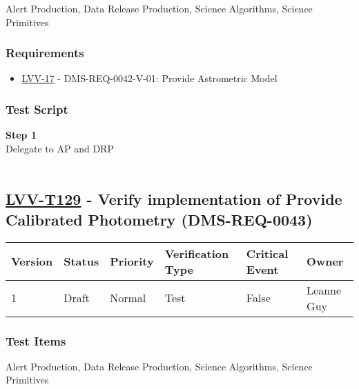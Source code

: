 Alert Production, Data Release Production, Science Algorithms, Science
Primitives~

\hypertarget{requirements-105}{%
\subsubsection{Requirements}\label{requirements-105}}

\begin{itemize}
\tightlist
\item
  \href{https://jira.lsstcorp.org/browse/LVV-17}{LVV-17} -
  DMS-REQ-0042-V-01: Provide Astrometric Model
\end{itemize}

\hypertarget{test-script-105}{%
\subsubsection{Test Script}\label{test-script-105}}

\textbf{Step 1}\\
Delegate to AP and DRP\\
~\\

\hypertarget{lvv-t129---verify-implementation-of-provide-calibrated-photometry-dms-req-0043}{%
\subsection{\texorpdfstring{\href{https://jira.lsstcorp.org/secure/Tests.jspa\#/testCase/LVV-T129}{LVV-T129}
- Verify implementation of Provide Calibrated Photometry
(DMS-REQ-0043)}{LVV-T129 - Verify implementation of Provide Calibrated Photometry (DMS-REQ-0043)}}\label{lvv-t129---verify-implementation-of-provide-calibrated-photometry-dms-req-0043}}

\begin{longtable}[]{@{}llllll@{}}
\toprule
Version & Status & Priority & Verification Type & Critical Event &
Owner\tabularnewline
\midrule
\endhead
1 & Draft & Normal & Test & False & Leanne Guy\tabularnewline
\bottomrule
\end{longtable}

\hypertarget{test-items-105}{%
\subsubsection{Test Items}\label{test-items-105}}

Alert Production, Data Release Production, Science Algorithms, Science
Primitives~

